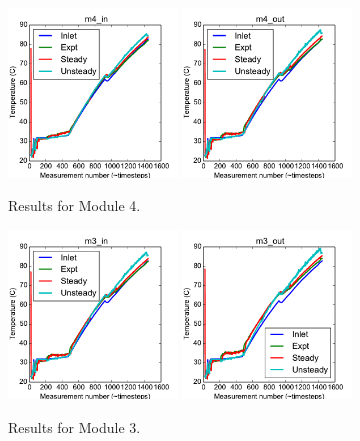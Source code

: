 \documentclass{article}
\begin{document}
\clearpage
\begin{figure}[!ht]
\centering
\includegraphics[width=0.4\textwidth]{../../data/ICSolar/images/Mar06_m4_in_compare.pdf}\hspace{0.05\textwidth}
\includegraphics[width=0.4\textwidth]{../../data/ICSolar/images/Mar06_m4_out_compare.pdf}\hspace{0.05\textwidth}\\
\caption{Results for Module 4.}\end{figure}
\begin{figure}[!ht]
\centering
\includegraphics[width=0.4\textwidth]{../../data/ICSolar/images/Mar06_m3_in_compare.pdf}\hspace{0.05\textwidth}
\includegraphics[width=0.4\textwidth]{../../data/ICSolar/images/Mar06_m3_out_compare.pdf}\hspace{0.05\textwidth}\\
\caption{Results for Module 3.}\end{figure}
\end{document}
